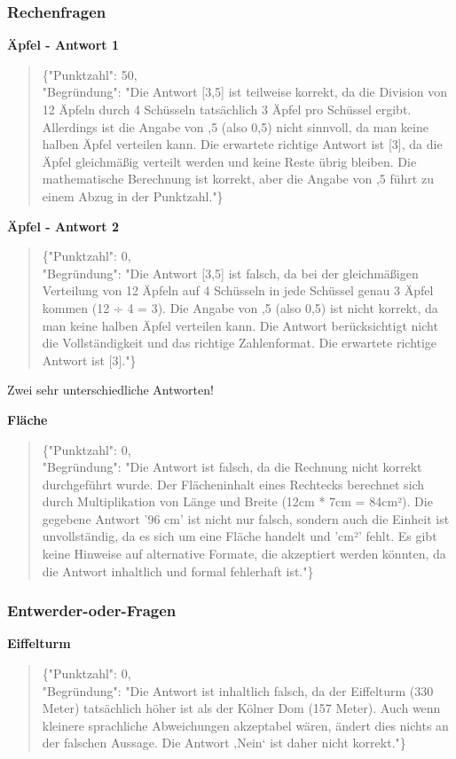 \documentclass[a4paper,12pt]{article}
\begin{document}
\subsubsection{Rechenfragen}

\textbf{Äpfel - Antwort 1}
\begin{quote}
\{"Punktzahl": 50,\\
"Begründung": "Die Antwort [3,5] ist teilweise korrekt, da die Division von 12 Äpfeln durch 4 Schüsseln tatsächlich 3 Äpfel pro Schüssel ergibt. Allerdings ist die Angabe von ,5 (also 0,5) nicht sinnvoll, da man keine halben Äpfel verteilen kann. Die erwartete richtige Antwort ist [3], da die Äpfel gleichmäßig verteilt werden und keine Reste übrig bleiben. Die mathematische Berechnung ist korrekt, aber die Angabe von ,5 führt zu einem Abzug in der Punktzahl."\}
\end{quote}

\textbf{Äpfel - Antwort 2}
\begin{quote}
\{"Punktzahl": 0,\\
"Begründung": "Die Antwort [3,5] ist falsch, da bei der gleichmäßigen Verteilung von 12 Äpfeln auf 4 Schüsseln in jede Schüssel genau 3 Äpfel kommen (12 ÷ 4 = 3). Die Angabe von ,5 (also 0,5) ist nicht korrekt, da man keine halben Äpfel verteilen kann. Die Antwort berücksichtigt nicht die Vollständigkeit und das richtige Zahlenformat. Die erwartete richtige Antwort ist [3]."\}
\end{quote}

Zwei sehr unterschiedliche Antworten!

\textbf{Fläche}
\begin{quote}
\{"Punktzahl": 0,\\
"Begründung": "Die Antwort ist falsch, da die Rechnung nicht korrekt durchgeführt wurde. Der Flächeninhalt eines Rechtecks berechnet sich durch Multiplikation von Länge und Breite (12cm * 7cm = 84cm²). Die gegebene Antwort '96 cm' ist nicht nur falsch, sondern auch die Einheit ist unvollständig, da es sich um eine Fläche handelt und 'cm²' fehlt. Es gibt keine Hinweise auf alternative Formate, die akzeptiert werden könnten, da die Antwort inhaltlich und formal fehlerhaft ist."\}
\end{quote}

\subsubsection{Entwerder-oder-Fragen}

\textbf{Eiffelturm}
\begin{quote}
\{"Punktzahl": 0,\\
"Begründung": "Die Antwort ist inhaltlich falsch, da der Eiffelturm (330 Meter) tatsächlich höher ist als der Kölner Dom (157 Meter). Auch wenn kleinere sprachliche Abweichungen akzeptabel wären, ändert dies nichts an der falschen Aussage. Die Antwort ‚Nein‘ ist daher nicht korrekt."\}
\end{quote}
\end{document}
